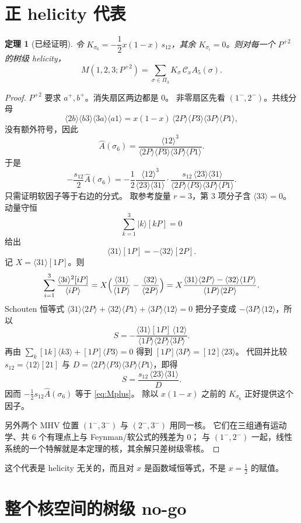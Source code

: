 \documentclass[11pt]{ctexart}
\numberwithin{equation}{section}
\newtheorem{theorem}{定理}
\theoremstyle{definition}
\theoremstyle{remark}
\newcommand{\ang}[1]{\langle #1\rangle}
\newcommand{\sq}[1]{[#1]}
\newcommand{\cA}{\mathcal C_x}
\begin{document}
\section{正 helicity 代表}
\label{sec:rep}

\begin{theorem}[已经证明]
\label{thm:rep}
令 $K_{\sigma_6}=-\dfrac12 x(1-x)\,s_{12}$，其余 $K_{\sigma_i}=0$。则对每一个 $P^{+2}$ 的树级 helicity，
\begin{equation}
M(1,2,3;P^{+2})
=\sum_{\sigma\in\Pi_3}K_\sigma\,\cA A_5(\sigma).
\label{eq:prep}
\end{equation}
\end{theorem}

\begin{proof}
$P^{+2}$ 要求 $a^+,b^+$。消失扇区两边都是 $0$。
非零扇区先看 $(1^-,2^-)$。共线分母
\[
\ang{2b}\ang{b3}\ang{3a}\ang{a1}
=x(1-x)\,\ang{2P}\ang{P3}\ang{3P}\ang{P1},
\]
没有额外符号，因此
\[
\widehat A(\sigma_6)
=\frac{\ang{12}^3}{\ang{2P}\ang{P3}\ang{3P}\ang{P1}}.
\]
于是
\[
-\frac{s_{12}}{2}\widehat A(\sigma_6)
=-\frac12\frac{\ang{12}^3}{\ang{23}\ang{31}}
\cdot
\frac{s_{12}\,\ang{23}\ang{31}}{\ang{2P}\ang{P3}\ang{3P}\ang{P1}}.
\]
只需证明软因子等于右边的分式。
取参考旋量 $r=3$，第 $3$ 项分子含 $\ang{33}=0$。
动量守恒
\[
\sum_{k=1}^3|k\rangle\sq{kP}=0
\]
给出
\[
\ang{31}\sq{1P}=-\ang{32}\sq{2P}.
\]
记 $X=\ang{31}\sq{1P}$。则
\[
\sum_{i=1}^3\frac{\ang{3i}^2\sq{iP}}{\ang{iP}}
=X\Bigl(\frac{\ang{31}}{\ang{1P}}-\frac{\ang{32}}{\ang{2P}}\Bigr)
=X\frac{\ang{31}\ang{2P}-\ang{32}\ang{1P}}{\ang{1P}\ang{2P}}.
\]
Schouten 恒等式
$\ang{31}\ang{2P}+\ang{32}\ang{P1}+\ang{3P}\ang{12}=0$
把分子变成 $-\ang{3P}\ang{12}$，所以
\[
S=-\frac{\ang{31}\sq{1P}\,\ang{12}}{\ang{1P}\ang{2P}\ang{3P}}.
\]
再由
$\sum_k\sq{1k}\ang{k3}+\sq{1P}\ang{P3}=0$
得到 $\sq{1P}\ang{3P}=\sq{12}\ang{23}$。
代回并比较 $s_{12}=\ang{12}\sq{21}$ 与
$D=\ang{2P}\ang{P3}\ang{3P}\ang{P1}$，即得
\[
S=\frac{s_{12}\,\ang{23}\ang{31}}{D}.
\]
因而 $-\frac12 s_{12}\widehat A(\sigma_6)$ 等于 \eqref{eq:Mplus}。
除以 $x(1-x)$ 之前的 $K_{\sigma_6}$ 正好提供这个因子。

另外两个 MHV 位置 $(1^-,3^-)$ 与 $(2^-,3^-)$ 用同一核。
它们在三组通有运动学、共 $6$ 个有理点上与 Feynman/软公式的残差为 $0$；
与 $(1^-,2^-)$ 一起，线性系统的一个特解就是本定理的核，其余解只差树级零核。
\end{proof}

这个代表是 helicity 无关的，而且对 $x$ 是函数域恒等式，不是 $x=\tfrac12$ 的赋值。

\section{整个核空间的树级 no-go}
\label{sec:nogo}
\end{document}
